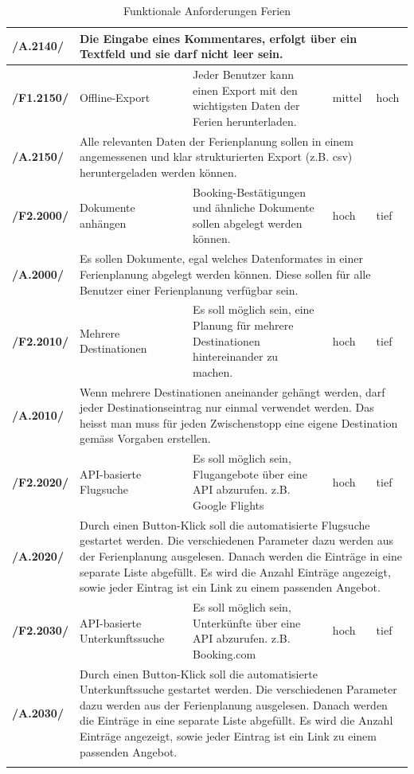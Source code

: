 \documentclass[10pt,a4paper,titlepage,twoside,german,final]{zhawreprt}
\newcommand{\AddRequirement}[2]{
\textbf{/#1#2/}
}
\newcommand{\F}[1]{
\AddRequirement{F1.}{#1}
}
\newcommand{\A}[1]{
\AddRequirement{A.}{#1}
}
\newcommand{\W}[1]{
\AddRequirement{F2.}{#1}
}
\numberwithin{table}{chapter}
\begin{document}
\begin{center}
\begin{longtable}{l|p{2.5cm}|p{5cm}|p{2cm}|p{1.5cm}}
\A{2140}&\multicolumn{4}{p{10cm}|}{
Die Eingabe eines Kommentares, erfolgt über ein Textfeld und sie darf nicht leer sein.}\\\hline
\F{2150} & Offline-Export & Jeder Benutzer kann einen Export mit den wichtigsten Daten der Ferien herunterladen. & mittel & hoch\\\hline
\A{2150}&\multicolumn{4}{p{10cm}|}{
Alle relevanten Daten der Ferienplanung sollen in einem angemessenen und klar strukturierten Export (z.B. csv) heruntergeladen werden können.}\\\hline
\W{2000} & Dokumente anhängen & Booking-Bestätigungen und ähnliche Dokumente sollen abgelegt werden können. & hoch & tief\\\hline
\A{2000}&\multicolumn{4}{p{10cm}|}{
Es sollen Dokumente, egal welches Datenformates in einer Ferienplanung abgelegt werden können. Diese sollen für alle Benutzer einer Ferienplanung verfügbar sein.}\\\hline
\W{2010} & Mehrere Destinationen & Es soll möglich sein, eine Planung für mehrere Destinationen hintereinander zu machen. & hoch & tief\\\hline
\A{2010}&\multicolumn{4}{p{10cm}|}{
Wenn mehrere Destinationen aneinander gehängt werden, darf jeder Destinationseintrag nur einmal verwendet werden. Das heisst man muss für jeden Zwischenstopp eine eigene Destination gemäss Vorgaben erstellen.}\\\hline
\W{2020} & API-basierte Flugsuche & Es soll möglich sein, Flugangebote über eine API abzurufen. z.B. Google Flights & hoch & tief\\\hline
\A{2020}&\multicolumn{4}{p{10cm}|}{
Durch einen Button-Klick soll die automatisierte Flugsuche gestartet werden. Die verschiedenen Parameter dazu werden aus der Ferienplanung ausgelesen. Danach werden die Einträge in eine separate Liste abgefüllt. Es wird die Anzahl Einträge angezeigt, sowie jeder Eintrag ist ein Link zu einem passenden Angebot.}\\\hline
\W{2030} & API-basierte Unterkunftssuche & Es soll möglich sein, Unterkünfte über eine API abzurufen. z.B. Booking.com & hoch & tief\\\hline
\A{2030}&\multicolumn{4}{p{10cm}|}{
Durch einen Button-Klick soll die automatisierte Unterkunftssuche gestartet werden. Die verschiedenen Parameter dazu werden aus der Ferienplanung ausgelesen. Danach werden die Einträge in eine separate Liste abgefüllt. Es wird die Anzahl Einträge angezeigt, sowie jeder Eintrag ist ein Link zu einem passenden Angebot.}\\\hline
\caption{Funktionale Anforderungen Ferien}\label{tbl:FuncVacation}
\end{longtable}
\end{center}\newpage
\end{document}
